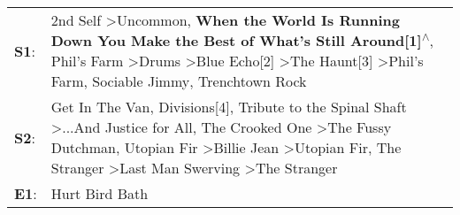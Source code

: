 \begin{supertabular}{p{0.03\textwidth}p{0.92\textwidth}}
 \textbf{S1}:  &                                                                   2nd Self\textsuperscript{} \textgreater \enspace Uncommon\textsuperscript{}, \enspace \textbf{When the World Is Running Down You Make the Best of What's Still Around[1]\textsuperscript{$\wedge$}}, \enspace Phil's Farm\textsuperscript{} \textgreater \enspace Drums\textsuperscript{} \textgreater \enspace Blue Echo[2]\textsuperscript{} \textgreater \enspace The Haunt[3]\textsuperscript{} \textgreater \enspace Phil's Farm\textsuperscript{}, \enspace Sociable Jimmy\textsuperscript{}, \enspace Trenchtown Rock\textsuperscript{}  \enspace  \\
 \textbf{S2}:  &  Get In The Van\textsuperscript{}, \enspace Divisions[4]\textsuperscript{}, \enspace Tribute to the Spinal Shaft\textsuperscript{} \textgreater \enspace ...And Justice for All\textsuperscript{}, \enspace The Crooked One\textsuperscript{} \textgreater \enspace The Fussy Dutchman\textsuperscript{}, \enspace Utopian Fir\textsuperscript{} \textgreater \enspace Billie Jean\textsuperscript{} \textgreater \enspace Utopian Fir\textsuperscript{}, \enspace The Stranger\textsuperscript{} \textgreater \enspace Last Man Swerving\textsuperscript{} \textgreater \enspace The Stranger\textsuperscript{}  \enspace  \\
 \textbf{E1}:  &                                                                                                                                                                                                                                                                                                                                                                                                                                                                                                                                                                                 Hurt Bird Bath\textsuperscript{}  \enspace  \\
\end{supertabular}
